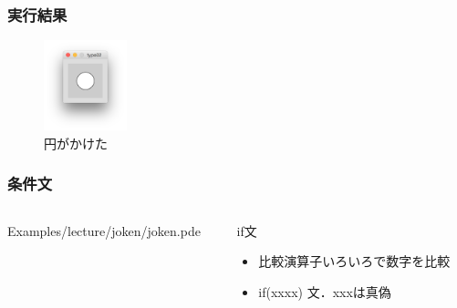 \documentclass[10pt, dvipdfmx]{beamer}
\begin{document}
        \begin{frame}
            \frametitle{実行結果}
                \begin{figure}[htb]
                    \includegraphics[width=24mm]{images/11.png}
                    \caption{円がかけた}
                    \label{fig:11}
                \end{figure}
        \end{frame}

        \begin{frame}
            \frametitle{条件文}
            \begin{columns}[c]
                \begin{column}{0.50\textwidth}
                    \tiny
                    Examples/lecture/joken/joken.pde
                    \scriptsize
                \end{column}
                \begin{column}{0.50\textwidth}
                    \begin{block}{if文}
                        \begin{itemize}
                            \item 比較演算子いろいろで数字を比較
                            \item if(xxxx) 文．xxxは真偽
                        \end{itemize}
                    \end{block}
                \end{column}
            \end{columns}
        \end{frame}
\end{document}
